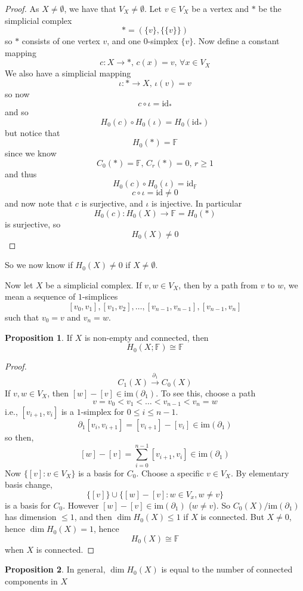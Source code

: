 \documentclass[a4paper,14pt]{extarticle}
\theoremstyle{definition}
\newtheorem*{proposition}{Proposition}
\begin{document}
\begin{proof}
	As $X\neq\emptyset$, we have that $V_X\neq\emptyset$. Let $v\in V_X$ be a vertex and $*$ be the simplicial complex \[*=(\{v\},\{\{v\}\})\] so $*$ consists of one vertex
	$v$, and one $0$-simplex $\{v\}$. Now define a constant mapping \[c:X\rightarrow *, \,c(x)=v,\,\forall x\in V_X\] We also have a simplicial mapping 
	\[\iota:*\rightarrow X, \,\iota(v)=v\] so now \[c\circ\iota=\text{id}_*\] and so \[H_0(c)\circ H_0(\iota)=H_0(\text{id}_*)\] but notice that \[H_0(*)=\mathbb{F}\] since we know
	\[C_0(*)=\mathbb{F}, \,C_r(*)=0,\,r\geq1\] and thus \[H_0(c)\circ H_0(\iota)=\text{id}_\mathbb{F}\] \[c\circ\iota=\text{id}\neq0\] and now note that $c$ is surjective,
	and $\iota$ is injective. In particular \[H_0(c):H_0(X)\rightarrow\mathbb{F}=H_0(*)\] is surjective, so \[H_0(X)\neq0\]
\end{proof}

\noindent So we now know if $H_0(X)\neq0$ if $X\neq\emptyset$.

\vspace{12pt}

Now let $X$ be a simplicial complex. If $v,w\in V_X$, then by a path from $v$ to $w$, we mean
a sequence of $1$-simplices \[[v_0,v_1],[v_1,v_2],\ldots,[v_{n-1},v_{n-1}],[v_{n-1},v_n]\]
such that $v_0=v$ and $v_n=w$.

\begin{proposition}
	If $X$ is non-empty and connected, then \[H_0(X;\mathbb{F})\cong\mathbb{F}\]
\end{proposition}

\begin{proof}
	\[C_1(X)\xrightarrow{\partial_1} C_0(X)\]
	If $v,w\in V_X$, then $[w]-[v]\in\text{im}(\partial_1)$. To see this, choose a path
	\[v=v_0<v_1<\ldots<v_{n-1}<v_n=w\] i.e., $[v_{i+1},v_i]$ is a $1$-simplex for
	$0\leq i\leq n-1$. \[\partial_1[v_i,v_{i+1}]=[v_{i+1}]-[v_i]\in\text{im}(\partial_1)\]
	so then, \[[w]-[v]=\sum_{i=0}^{n-1}[v_{i+1},v_i]\in\text{im}(\partial_1)\]
	Now $\{[v]:v\in V_X\}$ is a basis for $C_0$. Choose a specific $v\in V_X$. By elementary
	basis change, \[\{[v]\}\cup\{[w]-[v]:w\in V_x,w\neq v\}\] is a basis for $C_0$.
	However $[w]-[v]\in\text{im}(\partial_1)$ ($w\neq v$). So $C_0(X)/\text{im}(\partial_1)$ has
	dimension $\leq 1$, and then $\dim H_0(X)\leq 1$ if $X$ is connected. But $X\neq0$, hence
	$\dim H_0(X)=1$, hence \[H_0(X)\cong \mathbb{F}\] when $X$ is connected.
\end{proof}

\begin{proposition}
	In general, $\dim H_0(X)$ is equal to the number of connected components in $X$
\end{proposition}
\end{document}
